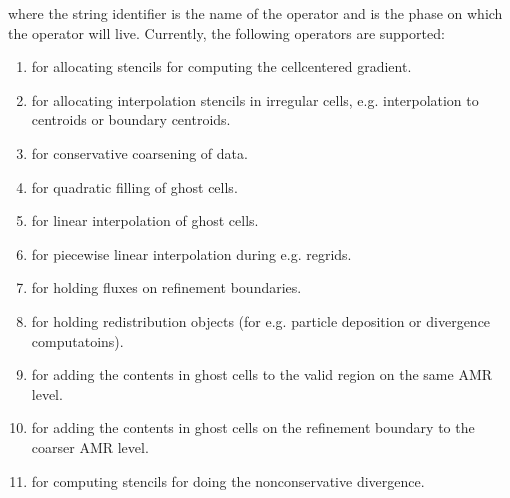 \documentclass[letterpaper,10pt,english]{sphinxmanual}
\begin{document}
where the string identifier is the name of the operator and  is the phase on which the operator will live.
Currently, the following operators are supported:
\begin{enumerate}
%
\item {} 
 for allocating stencils for computing the cell\sphinxhyphen{}centered gradient.

\item {} 
 for allocating interpolation stencils in irregular cells, e.g. interpolation to centroids or boundary centroids.

\item {} 
 for conservative coarsening of data.

\item {} 
 for quadratic filling of ghost cells.

\item {} 
 for linear interpolation of ghost cells.

\item {} 
 for piecewise linear interpolation during e.g. regrids.

\item {} 
 for holding fluxes on refinement boundaries.

\item {} 
 for holding redistribution objects (for e.g. particle deposition or divergence computatoins).

\item {} 
 for adding the contents in ghost cells to the valid region on the same AMR level.

\item {} 
 for adding the contents in ghost cells on the refinement boundary to the coarser AMR level.

\item {} 
 for computing stencils for doing the non\sphinxhyphen{}conservative divergence.

\end{enumerate}
\end{document}
